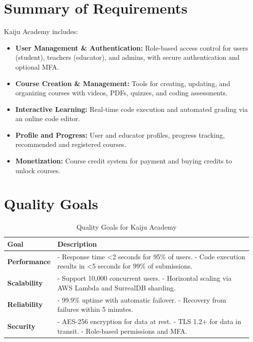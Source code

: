 \documentclass[a4paper, 11pt]{scrreprt}
\begin{document}
\section{Summary of Requirements}
Kaiju Academy includes:

\begin{itemize}
    \item \textbf{User Management \& Authentication:} Role-based access control for users (student), teachers (educator), and admins, with secure authentication and optional MFA.
    \item \textbf{Course Creation \& Management:} Tools for creating, updating, and organizing courses with videos, PDFs, quizzes, and coding assessments.
    \item \textbf{Interactive Learning:} Real-time code execution and automated grading via an online code editor.
    \item \textbf{Profile and Progress:} User and educator profiles, progress tracking, recommended and registered courses.
    \item \textbf{Monetization:} Course credit system for payment and buying credits to unlock courses.
\end{itemize}

\section{Quality Goals}
\begin{table}[htp]
    \centering
    \begin{tabularx}{\textwidth}{|l|X|}
        \hline
        \textbf{Goal} & \textbf{Description} \\
        \hline
        \textbf{Performance} & - Response time <2 seconds for 95\% of users. \newline - Code execution results in <5 seconds for 99\% of submissions. \\
        \hline
        \textbf{Scalability} & - Support 10,000 concurrent users. \newline - Horizontal scaling via AWS Lambda and SurrealDB sharding. \\
        \hline
        \textbf{Reliability} & - 99.9\% uptime with automatic failover. \newline - Recovery from failures within 5 minutes. \\
        \hline
        \textbf{Security} & - AES-256 encryption for data at rest. \newline - TLS 1.2+ for data in transit. \newline - Role-based permissions and MFA. \\
        \hline
    \end{tabularx}
    \caption{Quality Goals for Kaiju Academy}
\end{table}
\end{document}
